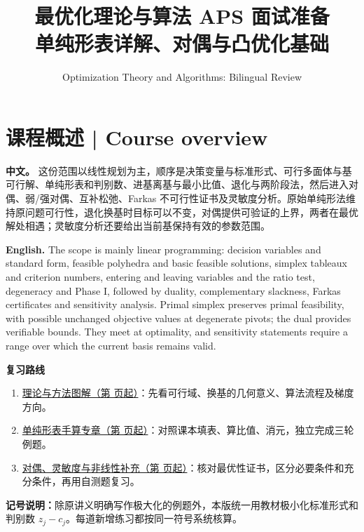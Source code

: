 \documentclass[UTF8,11pt,a4paper]{ctexart}
\title{最优化理论与算法 APS 面试准备\\[4pt]\large 单纯形表详解、对偶与凸优化基础}
\author{Optimization Theory and Algorithms: Bilingual Review}
\date{}
\newcommand{\APS}[2]{\par\noindent\textbf{中文。} #1\par\noindent\textbf{English.} #2\par\smallskip}
\begin{document}
\maketitle

\section*{课程概述 | Course overview}
\APS{这份范围以线性规划为主，顺序是决策变量与标准形式、可行多面体与基可行解、单纯形表和判别数、进基离基与最小比值、退化与两阶段法，然后进入对偶、弱/强对偶、互补松弛、Farkas 不可行性证书及灵敏度分析。原始单纯形法维持原问题可行性，退化换基时目标可以不变，对偶提供可验证的上界，两者在最优解处相遇；灵敏度分析还要给出当前基保持有效的参数范围。}{The scope is mainly linear programming: decision variables and standard form, feasible polyhedra and basic feasible solutions, simplex tableaux and criterion numbers, entering and leaving variables and the ratio test, degeneracy and Phase I, followed by duality, complementary slackness, Farkas certificates and sensitivity analysis. Primal simplex preserves primal feasibility, with possible unchanged objective values at degenerate pivots; the dual provides verifiable bounds. They meet at optimality, and sensitivity statements require a range over which the current basis remains valid.}
\medskip\noindent\textbf{复习路线}\par
\begin{enumerate}
\item \hyperref[opt:graphs]{理论与方法图解（第 \pageref*{opt:graphs} 页起）}：先看可行域、换基的几何意义、算法流程及梯度方向。
\item \hyperref[opt:tableau]{单纯形表手算专章（第 \pageref*{opt:tableau} 页起）}：对照课本填表、算比值、消元，独立完成三轮例题。
\item \hyperref[opt:theory]{对偶、灵敏度与非线性补充（第 \pageref*{opt:theory} 页起）}：核对最优性证书，区分必要条件和充分条件，再用自测题复习。
\end{enumerate}
\noindent\textbf{记号说明：}除原讲义明确写作极大化的例题外，本版统一用教材极小化标准形式和判别数 $z_j-c_j$。每道新增练习都按同一符号系统核算。\par

\clearpage
\end{document}
